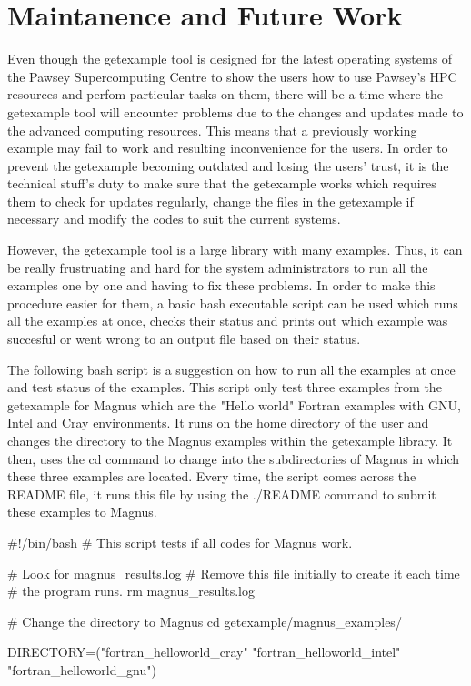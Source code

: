 \documentclass[journal]{IEEEtran}
\begin{document}
\section{Maintanence and Future Work}

Even though the getexample tool is designed for the latest operating systems of the Pawsey Supercomputing Centre to show the users how to use
Pawsey's HPC resources and perfom particular tasks on them, there will be a time where the getexample tool will encounter problems due 
to the changes and updates made to the advanced computing resources. This means that a previously working example may fail to work and resulting 
inconvenience for the users. In order to prevent the getexample becoming outdated and losing the users' trust, it is the technical stuff's 
duty to make sure that the getexample works which requires them to check for updates regularly, change the files in the getexample if necessary and 
modify the codes to suit the current systems.

However, the getexample tool is a large library with many examples. Thus, it can be really frustruating and hard for the system administrators to run 
all the examples one by one and having to fix these problems. In order to make this procedure easier for them, a basic bash executable script can be 
used which runs all the examples at once, checks their status and prints out which example was succesful or went wrong to an output file based on their
status.

The following bash script is a suggestion on how to run all the examples at once and test status of the examples. This script only test three examples
from the getexample for Magnus which are the "Hello world" Fortran examples with GNU, Intel and Cray environments. It runs on the home directory of the
user and changes the directory to the Magnus examples within the getexample library. It then, uses the cd command to change into the subdirectories of 
Magnus in which these three examples are located. Every time, the script comes across the README file, it runs this file by using the ./README command
to submit these examples to Magnus.

#!/bin/bash
# This script tests if all codes for Magnus work.

# Look for magnus_results.log
# Remove this file initially to create it each time
# the program runs.
rm magnus_results.log  

# Change the directory to Magnus
cd getexample/magnus_examples/

DIRECTORY=("fortran_helloworld_cray" 
           "fortran_helloworld_intel" 
	   "fortran_helloworld_gnu")
\end{document}
